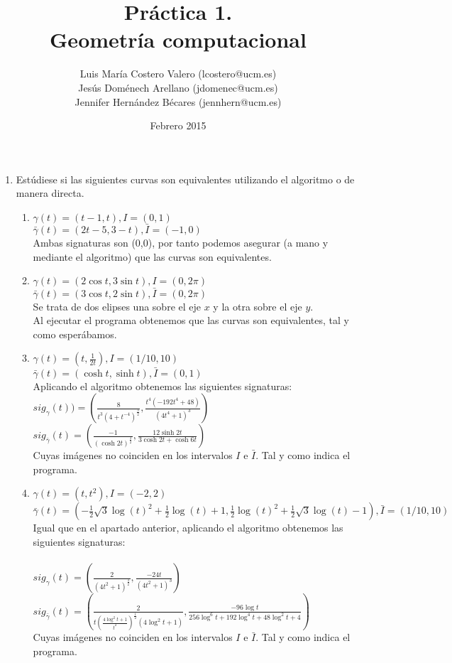 \documentclass[12pt,a4paper]{article}
\title{Práctica 1. \\ Geometría computacional}
\author{Luis María Costero Valero (lcostero@ucm.es)\\ Jesús Doménech
  Arellano (jdomenec@ucm.es) \\ Jennifer Hernández Bécares (jennhern@ucm.es)}
\date{Febrero 2015}
\begin{document}
\maketitle
\onehalfspace

\begin{enumerate}
\item Estúdiese si las siguientes curvas son equivalentes utilizando el
  algoritmo o de manera directa.
  \begin{enumerate}
  \item $\gamma(t)=(t-1,t),I=(0,1)$ \\
    $\bar{\gamma}(t)=(2t-5,3-t),\bar{I}=(-1,0)$ \\ Ambas signaturas son
    (0,0), por tanto podemos asegurar (a mano y mediante el algoritmo) que
    las curvas son equivalentes. \\
  \item $\gamma(t)=(2\cos t,3\sin t),I=(0,2\pi)$ \\
    $\bar{\gamma}(t)=(3\cos t,2\sin t),\bar{I}=(0,2\pi)$ \\ 
    Se trata de dos elipses una sobre el eje $x$ y la otra sobre el
    eje $y$.\\
    Al ejecutar el programa obtenemos que las curvas son
    equivalentes, tal y como esperábamos. 
  \item $\gamma(t)=(t,\frac{1}{2t}),I=(1/10, 10)$ \\
    $\bar{\gamma}(t)=(\cosh t,\sinh t),\bar{I}=(0,1)$ \\
    Aplicando el algoritmo obtenemos las siguientes signaturas:\\
    $sig_{\gamma}(t)) = (\frac{8}{t^{3}(4 + t^{-4})^{\frac{3}{2}}},
    \frac{t^{4}(-192t^{4} + 48)}{(4t^{4} + 1)^{3}})$ \\
    $sig_{\bar{\gamma}}(t) = (\frac{-1}{(\cosh
      2t)^{\frac{3}{2}}},\frac{12\sinh 2t}{3\cosh 2t + \cosh 6t})$ \\
    Cuyas imágenes no coinciden en los intervalos $I$ e $\bar{I}$. Tal
    y como indica el programa.
  \item $\gamma(t)=(t,t^{2}),I=(-2,2)$ 
    $\bar{\gamma}(t)=(-\frac{1}{2}\sqrt{3}\log(t)^{2}+\frac{1}{2}\log(t)+1,\frac{1}{2}\log(t)^{2}+\frac{1}{2}\sqrt{3}\log(t)-1),\bar{I}=(1/10,10)$
    \\Igual que en el apartado anterior, aplicando el algoritmo
    obtenemos las siguientes signaturas:\\
    \\$sig_{\gamma}(t) = (\frac{2}{(4t^{2} + 1)^{\frac{3}{2}}},
    \frac{-24t}{(4t^{2} + 1)^3})$
\\$sig_{\bar{\gamma}}(t) = (\frac{2}{t(\frac{4\log^2 t +
    1}{t^2})^{\frac{1}{2}}(4\log^2 t + 1)}, \frac{-96\log t}{256\log^6
  t + 192\log^4 t + 48\log^2 t + 4})$
\\Cuyas imágenes no coinciden en los intervalos $I$ e $\bar{I}$. Tal
    y como indica el programa.
  \end{enumerate}


\end{enumerate}
\end{document}
